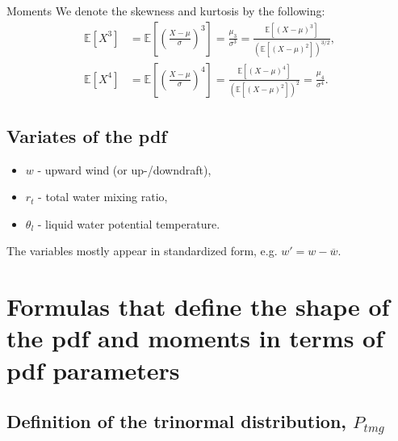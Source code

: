 \documentclass[10pt]{beamer}
\numberwithin{equation}{section}
\begin{document}
    \begin{frame}{Moments}
        We denote the skewness and kurtosis by the following:
        \begin{align}
            \mathbb{E}[X^3]
            &= \mathbb{E}\left[\left(\frac{X-\mu}{\sigma}\right)^3\right]
            = \frac{\mu_3}{\sigma^3}
            = \frac{\mathbb{E}[(X-\mu)^3]}{(\mathbb{E}[(X-\mu)^2])^{3/2}}, \\
            \mathbb{E}[X^4]
            &= \mathbb{E}\left[\left(\frac{X-\mu}{\sigma}\right)^4\right]
            = \frac{\mathbb{E}[(X-\mu)^4]}{(\mathbb{E}[(X-\mu)^2])^2}
            = \frac{\mu_4}{\sigma^4}.
        \end{align}
    \end{frame}

    \subsection{Variates of the pdf}\label{subsec:variates-of-the-pdf}

    \begin{frame}
        \begin{itemize}
            \item $w$ - upward wind (or up-/downdraft),
            \item $r_t$ - total water mixing ratio,
            \item $\theta_l$ - liquid water potential temperature.
        \end{itemize}
        \vspace{2cm}

        The variables mostly appear in standardized form,
        e.g. $w' = w - \overline{w}$.
    \end{frame}


    \section{Formulas that define the shape of the pdf and moments in terms of pdf parameters}
    \label{sec:formulas-that-define-the-shape-of-the-pdf-and-moments-in-terms-of-pdf-parameters}

    \subsection{Definition of the trinormal distribution, \texorpdfstring{$P_{tmg}$}{P tmg}}
    \label{subsec:definition-of-the-trinormal-distribution-p_tmg}
\end{document}
